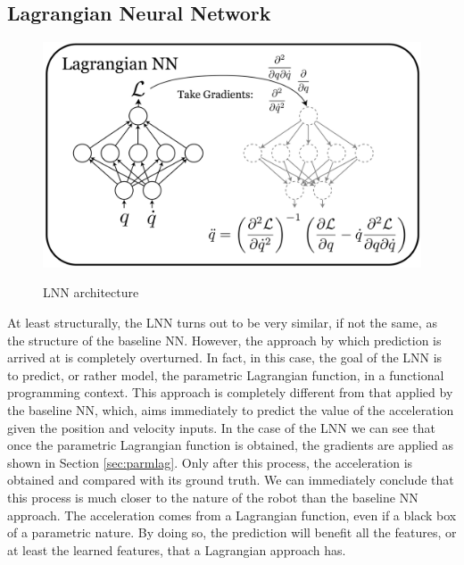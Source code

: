 \documentclass[a4paper]{article}
\begin{document}
\subsection{Lagrangian Neural Network}
\begin{figure}
\begin{center}
    \label{img:lnn_arch}
    \includegraphics[scale=0.1]{./img/lnn.png}  
    \caption{LNN architecture}
\end{center}
\end{figure}
At least structurally, the LNN turns out to be very similar, if not the same, as the structure of the baseline NN. However, the approach by which prediction is arrived at is completely overturned. In fact, in this case, the goal of the LNN is to predict, or rather model, the parametric Lagrangian function, in a functional programming context. This approach is completely different from that applied by the baseline NN, which, aims immediately to predict the value of the acceleration given the position and velocity inputs. In the case of the LNN we can see that once the parametric Lagrangian function is obtained, the gradients are applied as shown in Section \ref{sec:parmlag}. Only after this process, the acceleration is obtained and compared with its ground truth. We can immediately conclude that this process is much closer to the nature of the robot than the baseline NN approach. The acceleration comes from a Lagrangian function, even if a black box of a parametric nature. By doing so, the prediction will benefit all the features, or at least the learned features, that a Lagrangian approach has.

\end{document}
